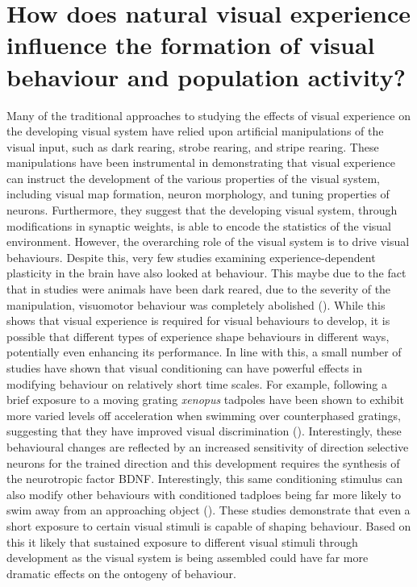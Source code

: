 \section{How does natural visual experience influence the formation of visual behaviour and population activity?}

Many of the traditional approaches to studying the effects of visual experience on the developing visual system have relied upon artificial manipulations of the visual input, such as dark rearing, strobe rearing, and stripe rearing. These manipulations have been instrumental in demonstrating that visual experience can instruct the development of the various properties of the visual system, including visual map formation, neuron morphology, and tuning properties of neurons. Furthermore, they suggest that the developing visual system, through modifications in synaptic weights, is able to encode the statistics of the visual environment.  However, the overarching role of the visual system is to drive visual behaviours. Despite this, very few studies examining experience-dependent plasticity in the brain have also looked at behaviour. This maybe due to the fact that in studies were animals have been dark reared, due to the severity of the manipulation, visuomotor behaviour was completely abolished (\cite{Kalil1978DarkNucleus, Mower1982BehavioralCat, Avitan2017}). While this shows that visual experience is required for visual behaviours to develop, it is possible that different types of experience shape behaviours in different ways, potentially even enhancing its performance. In line with this, a small number of studies have shown that visual conditioning can have powerful effects in modifying behaviour on relatively short time scales. For example, following a brief exposure to a moving grating \textit{xenopus} tadpoles have been shown to exhibit more varied levels off acceleration when swimming over counterphased gratings, suggesting that they have improved visual discrimination (\cite{Schwartz2011Activity-DependentDevelopment}). Interestingly, these behavioural changes are reflected by an increased sensitivity of direction selective neurons for the trained direction and this development requires the synthesis of the neurotropic factor BDNF. Interestingly, this same conditioning stimulus can also modify other behaviours with conditioned tadploes being far more likely to swim away from an approaching object (\cite{Shen2014AcuteXenopus}). These studies demonstrate that even a short exposure to certain visual stimuli is capable of shaping behaviour. Based on this it likely that sustained exposure to different visual stimuli through development as the visual system is being assembled could have far more dramatic effects on the ontogeny of behaviour. 


